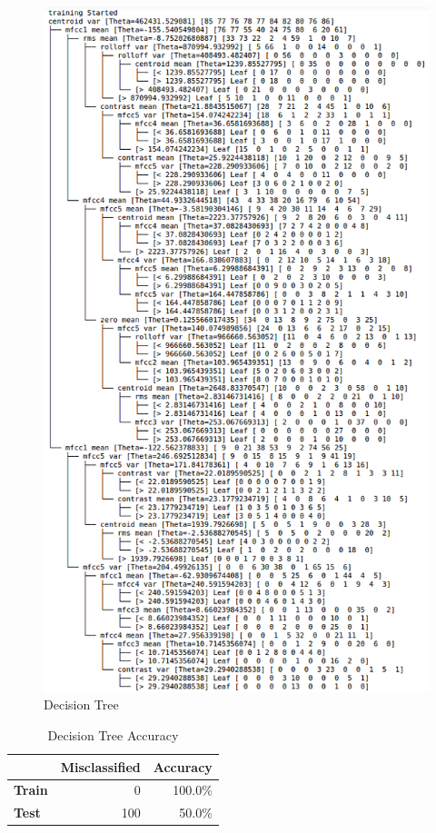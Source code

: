 \documentclass[a4paper,10pt]{article}
\begin{document}
\begin{figure}[ht]
    \centering
    \includegraphics[scale=0.7]{withoutMargin.png}
    \caption{Decision Tree}
    \label{fig:decision_tree}
\end{figure}

\begin{table}[!ht]
    \centering
    \caption{Decision Tree Accuracy}
    \label{tbl:decision-tree-accuracy}
    \begin{tabular}{|l|r|r|}
    \hline
                   & \textbf{Misclassified} & \textbf{Accuracy} \\ \hline
    \textbf{Train} & 0                      & 100.0\%           \\ \hline
    \textbf{Test}  & 100                    & 50.0\%            \\ \hline
    \end{tabular}
\end{table}
\end{document}
